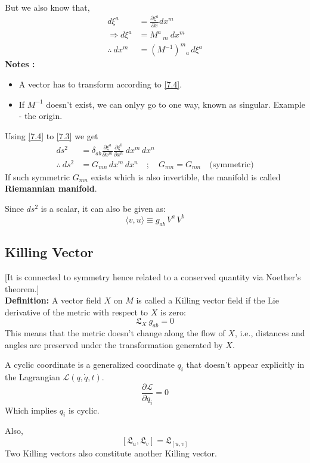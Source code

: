 \documentclass[14pt]{article} %
\begin{document}
But we also know that,
\begin{align*}
d\xi^a &= \frac{\partial\xi^a}{\partial x}dx^m \tag{7.4} \label{7.4} \\
\Rightarrow d\xi^a&= M^a\,_m ~dx^m \\
\therefore~ dx^m &= (M^{-1})^m{}_a \, d\xi^a
\end{align*}
\textbf{Notes :}
\begin{itemize}
\item A vector has to transform according to \eqref{7.4}.
\item If $M^{-1}$ doesn't exist, we can onlyy go to one way, known as singular. Example - the origin.
\end{itemize}
Using \eqref{7.4} to \eqref{7.3} we get
\begin{align*}
ds^2 &= \delta_{ab} \frac{\partial\xi^a}{\partial x^m} \frac{\partial  \xi^b}{\partial x^n}~dx^m \, dx^n \\
\therefore~ ds^2 &= G_{mn} \, dx^m \, dx^n \quad ; \quad G_{mn} = G_{nm} \quad \text{(symmetric)}
\end{align*}
If such symmetric $G_{mn}$ exists which is also invertible, the manifold is called \textbf{Riemannian manifold}.

Since $ds^2$ is a scalar, it can also be given as:
\[
    \langle v, u \rangle \equiv g_{ab} \, V^a \, V^b
\]

\subsection{Killing Vector}
[It is connected to symmetry hence related to a conserved quantity via Noether's theorem.]\\

\noindent
\textbf{Definition:} A vector field $X$ on $M$ is called a Killing vector field if the Lie derivative of the metric with respect to $X$ is zero:
\[
    \mathfrak{L}_X~g_{ab} = 0
\]
\noindent
This means that the metric doesn't change along the flow of $X$, i.e., distances and angles are preserved under the transformation generated by $X$.
\begin{tcolorbox}[ title=Cyclic Coordinates]
A cyclic coordinate is a generalized coordinate $q_i$ that doesn't appear explicitly in the Lagrangian $\mathcal{L}(q, \dot{q},t)$. 
\[
    \frac{\partial \mathcal{L}}{\partial q_i} = 0
\]
Which implies $q_i$ is cyclic.

\end{tcolorbox}
Also,
\[
    [\mathfrak{L}_u, \mathfrak{L}_v] = \mathfrak{L}_{[u, v]}
\]
Two Killing vectors also constitute another Killing vector.
\end{document}
